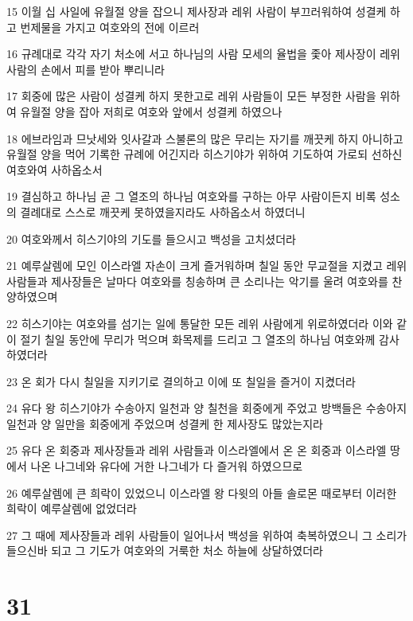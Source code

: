 \par 15 이월 십 사일에 유월절 양을 잡으니 제사장과 레위 사람이 부끄러워하여 성결케 하고 번제물을 가지고 여호와의 전에 이르러
\par 16 규례대로 각각 자기 처소에 서고 하나님의 사람 모세의 율법을 좇아 제사장이 레위 사람의 손에서 피를 받아 뿌리니라
\par 17 회중에 많은 사람이 성결케 하지 못한고로 레위 사람들이 모든 부정한 사람을 위하여 유월절 양을 잡아 저희로 여호와 앞에서 성결케 하였으나
\par 18 에브라임과 므낫세와 잇사갈과 스불론의 많은 무리는 자기를 깨끗케 하지 아니하고 유월절 양을 먹어 기록한 규례에 어긴지라 히스기야가 위하여 기도하여 가로되 선하신 여호와여 사하옵소서
\par 19 결심하고 하나님 곧 그 열조의 하나님 여호와를 구하는 아무 사람이든지 비록 성소의 결례대로 스스로 깨끗케 못하였을지라도 사하옵소서 하였더니
\par 20 여호와께서 히스기야의 기도를 들으시고 백성을 고치셨더라
\par 21 예루살렘에 모인 이스라엘 자손이 크게 즐거워하며 칠일 동안 무교절을 지켰고 레위 사람들과 제사장들은 날마다 여호와를 칭송하며 큰 소리나는 악기를 울려 여호와를 찬양하였으며
\par 22 히스기야는 여호와를 섬기는 일에 통달한 모든 레위 사람에게 위로하였더라 이와 같이 절기 칠일 동안에 무리가 먹으며 화목제를 드리고 그 열조의 하나님 여호와께 감사하였더라
\par 23 온 회가 다시 칠일을 지키기로 결의하고 이에 또 칠일을 즐거이 지켰더라
\par 24 유다 왕 히스기야가 수송아지 일천과 양 칠천을 회중에게 주었고 방백들은 수송아지 일천과 양 일만을 회중에게 주었으며 성결케 한 제사장도 많았는지라
\par 25 유다 온 회중과 제사장들과 레위 사람들과 이스라엘에서 온 온 회중과 이스라엘 땅에서 나온 나그네와 유다에 거한 나그네가 다 즐거워 하였으므로
\par 26 예루살렘에 큰 희락이 있었으니 이스라엘 왕 다윗의 아들 솔로몬 때로부터 이러한 희락이 예루살렘에 없었더라
\par 27 그 때에 제사장들과 레위 사람들이 일어나서 백성을 위하여 축복하였으니 그 소리가 들으신바 되고 그 기도가 여호와의 거룩한 처소 하늘에 상달하였더라

\chapter{31}

